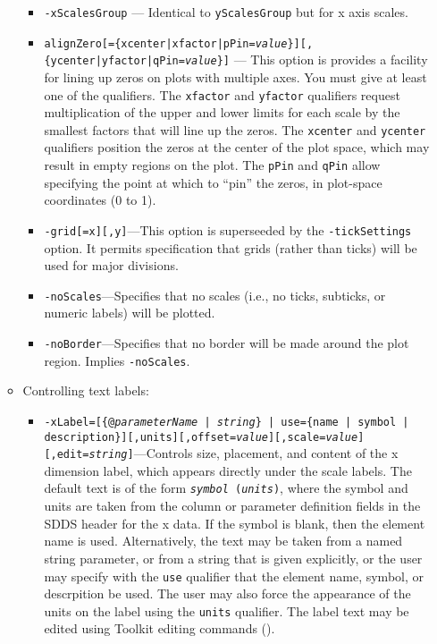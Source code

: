 \begin{itemize}
\begin{itemize}
\begin{itemize}
  \item {\tt -xScalesGroup} --- Identical to \verb|yScalesGroup| but for x axis scales.

  \item {\tt alignZero[=\{xcenter|xfactor|pPin={\em value}\}][,\{ycenter|yfactor|qPin={\em value}\}]} ---
  This option is provides a facility for lining up zeros on plots with multiple axes.  You must give
at least one of the qualifiers.  The {\tt xfactor} and {\tt yfactor} qualifiers request multiplication
of the upper and lower limits for each scale by the smallest factors that will line up the zeros.
The {\tt xcenter} and {\tt ycenter} qualifiers position the zeros at the center of the plot space,
which may result in empty regions on the plot.  The {\tt pPin} and {\tt qPin} allow specifying the
point at which to ``pin'' the zeros, in plot-space coordinates (0 to 1).

  \item {\tt -grid[=x][,y]}---This option is superseeded by the {\tt -tickSettings} option.  It permits specification
that grids (rather than ticks) will be used for major divisions.

  \item {\tt -noScales}---Specifies that no scales (i.e., no ticks, subticks, or numeric labels) will be plotted.

  \item {\tt -noBorder}---Specifies that no border will be made around the plot region.  Implies {\tt -noScales}.

  \end{itemize}
\item Controlling text labels:
  \begin{itemize}

  \item {\tt -xLabel=[\{@{\em parameterName} | {\em string}\} | use=\{name | symbol |
description\}][,units][,offset={\em value}][,scale={\em value}][,edit={\em string}]}---Controls size,
placement, and content of the x dimension label, which appears directly under the scale labels.  The
default text is of the form {\tt {\em symbol} ({\em units})}, where the symbol and units are taken from
the column or parameter definition fields in the SDDS header for the x data.  If the symbol is blank, then
the element name is used.  Alternatively, the text may be taken from a named string parameter, or from a
string that is given explicitly, or the user may specify with the {\tt use} qualifier that the
element name, symbol, or descrpition be used.  The user may also force the appearance of the units on the
label using the {\tt units} qualifier.   The label text may be edited using Toolkit editing commands
().


\end{itemize}
\end{itemize}
\end{itemize}
